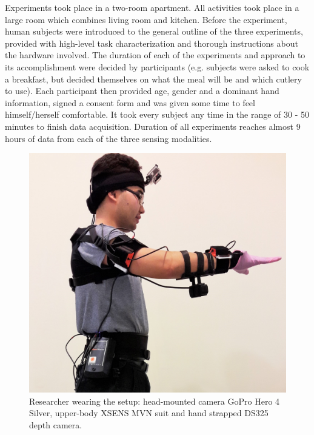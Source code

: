 \documentclass[journal]{IEEEtran}
\begin{document}
Experiments took place in a two-room apartment. All activities took place in a large room which combines living room and kitchen. Before the experiment, human subjects were introduced to the general outline of the three experiments, provided with high-level task characterization and thorough instructions about the hardware involved. The duration of each of the experiments and approach to its accomplishment were decided by participants (e.g. subjects were asked to cook a breakfast, but decided themselves on what the meal will be and which cutlery to use). Each participant then provided age, gender and a dominant hand information, signed a consent form and was given some time to feel himself/herself comfortable. It took every subject any time in the range of 30 - 50 minutes to finish data acquisition. Duration of all experiments reaches almost 9 hours of data from each of the three sensing modalities. 

\begin{figure}[t]
\includegraphics[scale=0.108]{Setup}
\caption{Researcher wearing the setup: head-mounted camera GoPro Hero 4 Silver, upper-body XSENS MVN suit and hand strapped DS325 depth camera.}
\label{fig:setup}
\centering
\end{figure}
\end{document}
